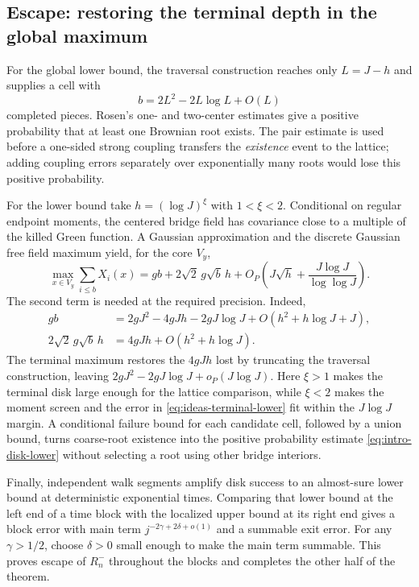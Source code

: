 \subsection{Escape: restoring the terminal depth in the global maximum}

For the global lower bound, the traversal construction reaches only
$L=J-h$ and supplies a cell with
\begin{equation}\label{eq:ideas-coarse-count}
 b=2L^2-2L\log L+O(L)
\end{equation}
completed pieces. Rosen's one- and two-center estimates give a positive
probability that at least one Brownian root exists. The pair estimate is
used before a one-sided strong coupling transfers the
\emph{existence} event to the lattice; adding coupling errors separately
over exponentially many roots would lose this positive probability.

For the lower bound take $h=(\log J)^\xi$ with $1<\xi<2$. Conditional on
regular endpoint moments, the centered bridge field has covariance close
to a multiple of the killed Green function. A Gaussian approximation and
the discrete Gaussian free field maximum yield, for the core $V_y$,
\begin{equation}\label{eq:ideas-terminal-lower}
 \max_{x\in V_y}\sum_{i\le b}X_i(x)
 =gb+2\sqrt2\,g\sqrt b\,h
 +O_P\left(J\sqrt h+\frac{J\log J}{\log\log J}\right).
\end{equation}
The second term is needed at the required precision. Indeed,
\begin{align*}
 gb&=2gJ^2-4gJh-2gJ\log J+O(h^2+h\log J+J),\\
 2\sqrt2\,g\sqrt b\,h&=4gJh+O(h^2+h\log J).
\end{align*}
The terminal maximum restores the $4gJh$ lost by truncating the
traversal construction, leaving
$2gJ^2-2gJ\log J+o_P(J\log J)$. Here $\xi>1$ makes the terminal disk
large enough for the lattice comparison, while $\xi<2$ makes the moment
screen and the error in \eqref{eq:ideas-terminal-lower} fit within the
$J\log J$ margin. A conditional failure bound for each candidate cell,
followed by a union bound, turns coarse-root existence into the positive
probability estimate \eqref{eq:intro-disk-lower} without selecting a root
using other bridge interiors.

Finally, independent walk segments amplify disk success to an almost-sure
lower bound at deterministic exponential times. Comparing that lower bound
at the left end of a time block with the localized upper bound at its right
end gives a block error with main term
$j^{-2\gamma+2\delta+o(1)}$ and a summable exit error. For any
$\gamma>1/2$, choose $\delta>0$ small enough to make the main term
summable. This proves escape of $R_n^-$ throughout the blocks and
completes the other half of the theorem.
